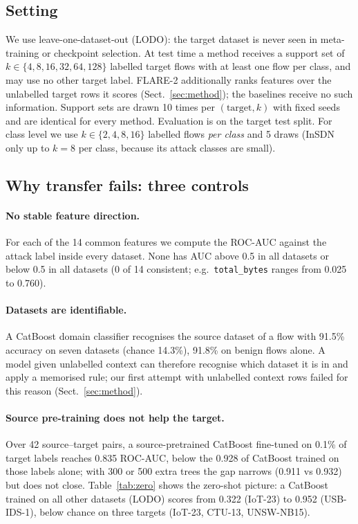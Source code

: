 \documentclass[11pt]{article}
\begin{document}
\subsection{Setting}
We use leave-one-dataset-out (LODO): the target dataset is never seen in meta-training or checkpoint selection.
At test time a method receives a support set of $k\in\{4,8,16,32,64,128\}$ labelled target flows with at least one flow per class, and may use no other target label. FLARE-2 additionally ranks features over the unlabelled target rows it scores (Sect.~\ref{sec:method}); the baselines receive no such information.
Support sets are drawn 10 times per $(\text{target},k)$ with fixed seeds and are identical for every method.
Evaluation is on the target test split.
For class level we use $k\in\{2,4,8,16\}$ labelled flows \emph{per class} and 5 draws (InSDN only up to $k=8$ per class, because its attack classes are small).

\subsection{Why transfer fails: three controls}\label{sec:shift}
\paragraph{No stable feature direction.}
For each of the 14 common features we compute the ROC-AUC against the attack label inside every dataset.
None has AUC above 0.5 in all datasets or below 0.5 in all datasets (0 of 14 consistent; e.g.\ \texttt{total\_bytes} ranges from 0.025 to 0.760).
\paragraph{Datasets are identifiable.}
A CatBoost domain classifier recognises the source dataset of a flow with 91.5\% accuracy on seven datasets (chance 14.3\%), 91.8\% on benign flows alone.
A model given unlabelled context can therefore recognise which dataset it is in and apply a memorised rule; our first attempt with unlabelled context rows failed for this reason (Sect.~\ref{sec:method}).
\paragraph{Source pre-training does not help the target.}
Over 42 source--target pairs, a source-pretrained CatBoost fine-tuned on 0.1\% of target labels reaches 0.835 ROC-AUC, below the 0.928 of CatBoost trained on those labels alone; with 300 or 500 extra trees the gap narrows (0.911 vs 0.932) but does not close.
Table~\ref{tab:zero} shows the zero-shot picture: a CatBoost trained on all other datasets (LODO) scores from 0.322 (IoT-23) to 0.952 (USB-IDS-1), below chance on three targets (IoT-23, CTU-13, UNSW-NB15).
\end{document}

